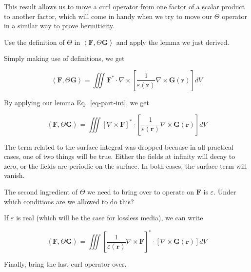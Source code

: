 This result allows us to move a curl operator from one factor of a scalar product to another factor, which will come in handy when we try to move our $\Theta$ operator in a similar way to prove hermiticity. 

\begin{cue}
Use the definition of  $\Theta$ in  $\left\langle {\mathbf F}, \Theta {\mathbf G}\right\rangle$ and apply the lemma we just derived.  
\end{cue}

Simply making use of definitions, we get

\begin{equation}
\left\langle {\mathbf F}, \Theta {\mathbf G}\right\rangle = \iiint {\mathbf F}^* \cdot\nabla \times \left[ \frac{1}{\varepsilon({\mathbf r})}\nabla \times {\mathbf G({\mathbf r})}  \right ] dV 
\end{equation} 

By applying our lemma Eq.~\ref{eq-part-int}, we get

\begin{equation}
\left\langle {\mathbf F}, \Theta {\mathbf G}\right\rangle = \iiint [ \nabla \times {\mathbf F}]^* \cdot \left[ \frac{1}{\varepsilon({\mathbf r})}\nabla \times {\mathbf G({\mathbf r})}  \right ] dV 
\label{eq-pos-omega}
\end{equation} 

The term related to the surface integral was dropped because in all practical cases, one of two things will be true. Either the fields at infinity will decay to zero, or the fields are periodic on the surface. In both cases, the surface term will vanish.

\begin{cue}
The second ingredient of $\Theta$ we need to bring over to operate on $ {\mathbf F}$ is  $\varepsilon$. Under which conditions are we allowed to do this?   
\end{cue}

If $\varepsilon$ is real (which will be the case for lossless media), we can write

\begin{equation}
\left\langle {\mathbf F}, \Theta {\mathbf G}\right\rangle = \iiint \left [\frac{1}{\varepsilon({\mathbf r})} \nabla \times {\mathbf F}\right]^* \cdot \left[ \nabla \times {\mathbf G({\mathbf r})}  \right ] dV 
\end{equation} 

\begin{cue}
Finally, bring the last curl operator over.
\end{cue}

